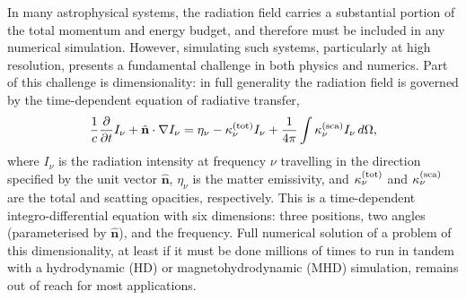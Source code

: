 \documentclass[fleqn,usenatbib]{mnras}
\newcommand{\hatn}{\hat{\mathbf{n}}}
\begin{document}
In many astrophysical systems, the radiation field carries a substantial portion of the total momentum and energy budget, and therefore must be included in any numerical simulation. However, simulating such systems, particularly at high resolution, presents a fundamental challenge in both physics and numerics. Part of this challenge is dimensionality: in full generality the radiation field is governed by the time-dependent equation of radiative transfer,
\begin{equation}
\frac{1}{c} \frac{\partial}{\partial t} I_\nu + \hatn\cdot\nabla I_\nu = \eta_\nu - \kappa^{\rm (tot)}_\nu I_\nu + \frac{1}{4\pi} \int \kappa^{\rm (sca)}_\nu I_\nu \, d\Omega,
\label{eq:transfer}
\end{equation}
where $I_\nu$ is the radiation intensity at frequency $\nu$ travelling in the direction specified by the unit vector $\hatn$, $\eta_\nu$ is the matter emissivity, and $\kappa_\nu^{\rm (tot)}$ and $\kappa_\nu^{\rm (sca)}$ are the total and scatting opacities, respectively. This is a time-dependent integro-differential equation with six dimensions: three positions, two angles (parameterised by $\hatn$), and the frequency. Full numerical solution of a problem of this dimensionality, at least if it must be done millions of times to run in tandem with a hydrodynamic (HD) or magnetohydrodynamic (MHD) simulation, remains out of reach for most applications. 
\end{document}
